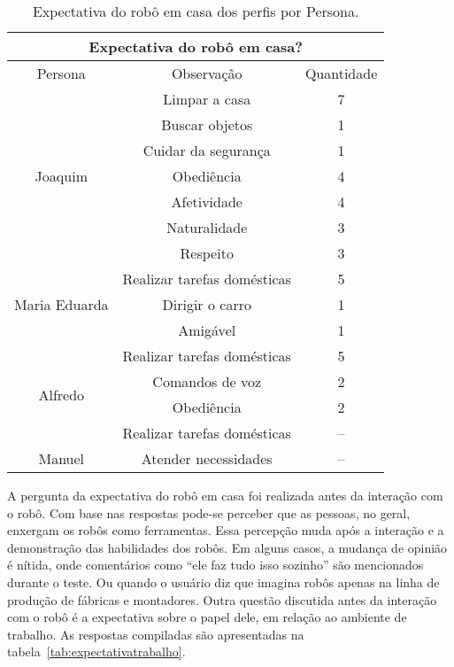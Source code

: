 \begin{table}[!ht]
	\caption{Expectativa do robô em casa dos perfis por Persona.}
	\label{tab:expectativacasa}
	\centering
	\begin{tabular}{c | c | c }
        \hline
        \multicolumn{3}{c}{Expectativa do robô em casa?} \\ \hline
        Persona & Observação & Quantidade \\ \hline
        \multirow{7}{*}{Joaquim} & Limpar a casa & 7 \\
        \hhline{~--}
        & Buscar objetos & 1 \\
        \hhline{~--}
        & Cuidar da segurança & 1 \\
        \hhline{~--}
        & Obediência & 4 \\
        \hhline{~--}
        & Afetividade & 4 \\
        \hhline{~--}
        & Naturalidade & 3 \\
        \hhline{~--}
        & Respeito & 3 \\
        \hline
        \multirow{3}{*}{Maria Eduarda} & Realizar tarefas domésticas & 5 \\
        \hhline{~--}
        & Dirigir o carro & 1 \\
        \hhline{~--}
        & Amigável & 1 \\
        \hline
        \multirow{4}{*}{Alfredo} & Realizar tarefas domésticas & 5 \\
        \hhline{~--}
        & Comandos de voz & 2 \\
        \hhline{~--}
        & Obediência & 2 \\
        \hline
        Danielo & Realizar tarefas domésticas & -- \\
        \hline
        Manuel & Atender necessidades & -- \\
        \hline
    \end{tabular}
\end{table}

A pergunta da expectativa do robô em casa foi realizada antes da interação com o robô. Com base nas respostas pode-se perceber que as pessoas, no geral, enxergam os robôs como ferramentas. Essa percepção muda após a interação e a demonstração das habilidades dos robôs. Em alguns casos, a mudança de opinião é nítida, onde comentários como ``ele faz tudo isso sozinho'' são mencionados durante o teste. Ou quando o usuário diz que imagina robôs apenas na linha de produção de fábricas e montadores. Outra questão discutida antes da interação com o robô é a expectativa sobre o papel dele, em relação ao ambiente de trabalho. As respostas compiladas são apresentadas na tabela~\ref{tab:expectativatrabalho}.

